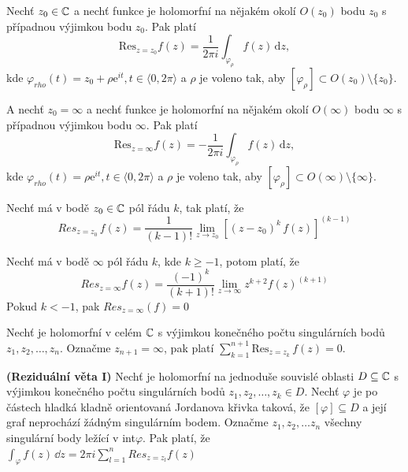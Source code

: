 \begin{theorem}
Nechť $z_0\in \mathbb{C}$ a nechť funkce \fz je holomorfní na nějakém okolí $O(z_0)$ bodu $z_0$ s případnou výjimkou bodu $z_0$. Pak platí 
\begin{equation*}
\mathrm{Res}_{z=z_0}f(z)=\frac{1}{2\pi i}\int_{\varphi_{\rho}}f(z) \, \mathrm{d} z,
\end{equation*}
 kde $\varphi_{rho}(t)=z_0+\rho\mathrm{e}^{it}, t \in \langle 0,2\pi \rangle$ a $\rho$ je voleno tak, aby $[\varphi_{\rho}] \subset O(z_0) \setminus \{z_0\}$.
 
 A nechť  $z_0=\infty $ a nechť funkce \fz je holomorfní na nějakém okolí $O(\infty)$ bodu $\infty$ s případnou výjimkou bodu $\infty$. Pak platí 
\begin{equation*}
\mathrm{Res}_{z=\infty}f(z)=-\frac{1}{2\pi i}\int_{\varphi_{\rho}}f(z) \, \mathrm{d} z,
\end{equation*}
 kde $\varphi_{rho}(t)=\rho\mathrm{e}^{it}, t \in \langle 0,2\pi \rangle$ a $\rho$ je voleno tak, aby $[\varphi_{\rho}] \subset O(\infty) \setminus \{\infty\}$.
 \end{theorem}

\begin{theorem}
	Nechť \fce \fz má v bodě $z_0 \in \mathbb{C}$ pól řádu $k$, tak platí, že 
	$$Res_{z=z_0} \, f(z)=\frac{1 }{(k-1)!} \lim_{z\rightarrow z_0}[(z-z_0)^k \, f(z)]^{(k-1)}$$
\end{theorem}
\begin{theorem}
	Nechť \fce \fz má v bodě $\infty$ pól řádu $k$, kde $k \geq -1$, potom platí, že 
	$$Res_{z=\infty} f(z) = \frac{(-1)^k}{(k+1)!} \lim_{z \rightarrow \infty} z ^{k+2}f(z)^{(k+1)}$$
	Pokud $k<-1$, pak $Res_{z=\infty}(f)=0$
\end{theorem}


\begin{theorem}
	Nechť \fce \fz je holomorfní v celém $\mathbb{C}$ s výjimkou konečného počtu singulárních bodů $z_1,z_2,\ldots, z_n. $ Označme $z_{n+1}=\infty$, pak platí  $\sum_{k=1}^{n+1}\text{Res}_{z=z_k}\, f(z)=0$.  
\end{theorem}

\begin{theorem}
\textbf{(Reziduální věta I)}
Nechť \fce \fz je holomorfní na jednoduše souvislé oblasti $D \subseteq \mathbb{C} $ s výjimkou konečného počtu singulárních bodů $z_1,z_2,\ldots, z_k \in D.$ Nechť $\varphi$ je po částech hladká kladně orientovaná Jordanova křivka taková, že $[\varphi] \subseteq D $ a její graf neprochází žádným singulárním bodem. Označme $z_1,z_2,\ldots z_n$ všechny singulární body ležící v int$\varphi$. Pak platí, že $\int_{\varphi} f(z) \,  \dd z= 2\pi i\sum_{l=1}^{n}Res_{z=z_l} f(z)  $ 

\end{theorem}

